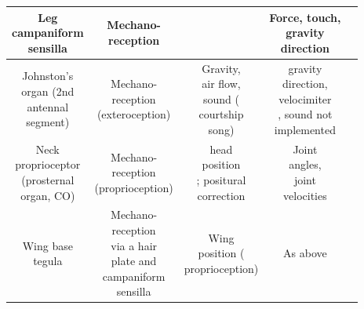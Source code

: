 \documentclass[sn-mathphys-num]{sn-jnl}%
\theoremstyle{thmstyleone}%
\theoremstyle{thmstyletwo}%
\theoremstyle{thmstylethree}%
\begin{document}
\begin{appendices}
\begin{table}[htbp]
\begin{tabular}{ccccc}
		\midrule
		\makecell{Leg \\ campaniform\\sensilla}     &   \makecell{Mechano-\\reception}      &   \makecell{Load/gravity} & \makecell{Force, touch,\\ gravity\\ direction} & \cite{dinges2021location} \\
		\midrule
		\makecell{Johnston's\\ organ (2nd \\ antennal\\ segment)}     &   \makecell{Mechano-\\reception \\ (exteroception)}      &   \makecell{Gravity, \\air flow,\\sound (\\courtship\\ song)} & \makecell{gravity \\direction,\\ velocimiter\\, sound not \\implemented} & \cite{kamikouchi2009neural,mimura1970convergence,mamiya2015antennal} \\
		\midrule
		\makecell{Neck \\proprioceptor\\ (prosternal\\ organ, CO)}     &   \makecell{Mechano-\\reception \\ (proprioception)}      &   \makecell{head \\position\\; positural\\ correction} & \makecell{Joint \\angles, \\joint \\velocities} & \cite{strausfeld1985convergence} \\
		\midrule
		\makecell{Wing base \\tegula}     &   \makecell{Mechano-\\reception \\ via a hair \\plate and \\ campaniform\\ sensilla}      &   \makecell{Wing \\position (\\proprioception)} & As above & \cite{fudalewicz1963innervation} \\
		\bottomrule
	\end{tabular}%
	\label{tab:s_4}%
\end{table}%





\end{appendices}
\end{document}
